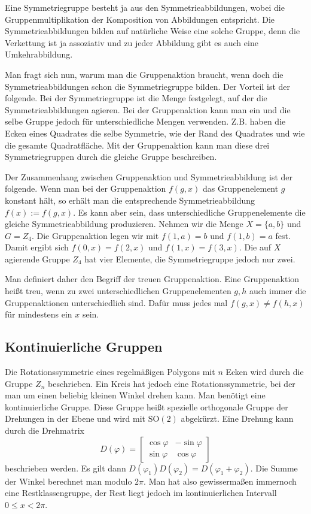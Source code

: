 \documentclass[a4paper,10pt,fleqn,twocolumn,twoside]{article}
\begin{document}
Eine Symmetriegruppe besteht ja aus den Symmetrieabbildungen, wobei die Gruppenmultiplikation der Komposition von Abbildungen entspricht. Die Symmetrieabbildungen bilden auf natürliche Weise eine solche Gruppe, denn die Verkettung ist ja assoziativ und zu jeder Abbildung gibt es auch eine Umkehrabbildung.

Man fragt sich nun, warum man die Gruppenaktion braucht, wenn doch die Symmetrieabbildungen schon die Symmetriegruppe bilden. Der Vorteil ist der folgende. Bei der Symmetriegruppe ist die Menge festgelegt, auf der die Symmetrieabbildungen agieren. Bei der Gruppenaktion kann man ein und die selbe Gruppe jedoch für unterschiedliche Mengen verwenden. Z.B. haben die Ecken eines Quadrates die selbe Symmetrie, wie der Rand des Quadrates und wie die gesamte Quadratfläche. Mit der Gruppenaktion kann man diese drei Symmetriegruppen durch die gleiche Gruppe beschreiben.

Der Zusammenhang zwischen Gruppenaktion und Symmetrieabbildung ist der folgende. Wenn man bei der Gruppenaktion \(f(g,x)\) das Gruppenelement \(g\) konstant hält, so erhält man die entsprechende Symmetrieabbildung \(f(x):=f(g,x)\). Es kann aber sein, dass unterschiedliche Gruppenelemente die gleiche Symmetrieabbildung produzieren. Nehmen wir die Menge \(X=\{a,b\}\) und \(G=Z_4\). Die Gruppenaktion legen wir mit \(f(1,a)=b\) und \(f(1,b)=a\) fest. Damit ergibt sich \(f(0,x)=f(2,x)\) und \(f(1,x)=f(3,x)\). Die auf \(X\) agierende Gruppe \(Z_4\) hat vier Elemente, die Symmetriegruppe jedoch nur zwei.

Man definiert daher den Begriff der treuen Gruppenaktion. Eine Gruppenaktion heißt treu, wenn zu zwei unterschiedlichen Gruppenelementen \(g,h\) auch immer die Gruppenaktionen unterschiedlich sind. Dafür muss jedes mal \(f(g,x)\ne f(h,x)\) für mindestens ein \(x\) sein.

\subsection{Kontinuierliche Gruppen}

Die Rotationssymmetrie eines regelmäßigen Polygons mit \(n\) Ecken wird durch die Gruppe \(Z_n\) beschrieben. Ein Kreis hat jedoch eine Rotationssymmetrie, bei der man um einen beliebig kleinen Winkel drehen kann. Man benötigt eine kontinuierliche Gruppe. Diese Gruppe heißt spezielle orthogonale Gruppe der Drehungen in der Ebene und wird  mit \(\mathrm{SO}(2)\) abgekürzt. Eine Drehung kann durch die Drehmatrix
\[D(\varphi) = \begin{bmatrix}
\cos\varphi & -\sin\varphi\\
\sin\varphi & \cos\varphi
\end{bmatrix}\]
beschrieben werden. Es gilt dann
\(D(\varphi_1)D(\varphi_2)=D(\varphi_1+\varphi_2)\).
Die Summe der Winkel berechnet man modulo \(2\pi\). Man hat
also gewissermaßen immernoch eine Restklassengruppe, der Rest liegt
jedoch im kontinuierlichen Intervall \(0\le x<2\pi\).
\end{document}
